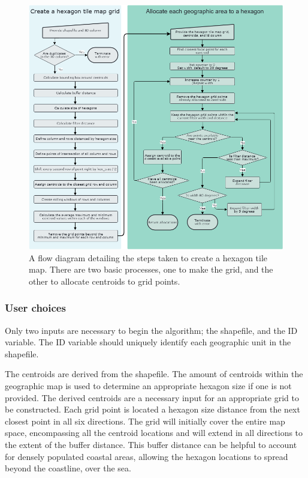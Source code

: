 \begin{figure}
\includegraphics[width=14cm]{figs/sugarbag flow.png}
\caption{\label{fig:sugarbag_flow}A flow diagram detailing the steps taken to create a hexagon tile map. There are two basic processes, one to make the grid, and the other to allocate centroids to grid points.}
\end{figure}

\hypertarget{user-choices}{%
\subsubsection{User choices}\label{user-choices}}

Only two inputs are necessary to begin the algorithm; the shapefile, and
the ID variable. The ID variable should uniquely identify each
geographic unit in the shapefile.

The centroids are derived from the shapefile. The amount of centroids
within the geographic map is used to determine an appropriate hexagon
size if one is not provided. The derived centroids are a necessary input
for an appropriate grid to be constructed. Each grid point is located a
hexagon size distance from the next closest point in all six directions.
The grid will initially cover the entire map space, encompassing all the
centroid locations and will extend in all directions to the extent of
the buffer distance. This buffer distance can be helpful to account for
densely populated coastal areas, allowing the hexagon locations to
spread beyond the coastline, over the sea.

